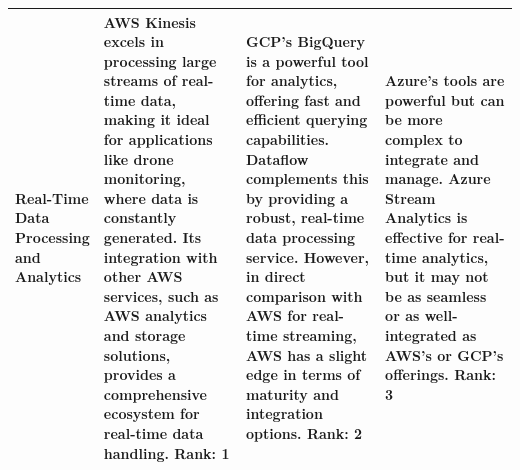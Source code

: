 \documentclass{article}
\begin{document}
\begin{table}[H]
\begin{tabular}{|p{0.1\linewidth}| p{0.3\linewidth} | p{0.3\linewidth} | p{0.3\linewidth} |}
        \hline 
        
        \textbf{Real-Time Data Processing and Analytics}&  \color{blue} AWS Kinesis excels in processing large streams of real-time data, making it ideal for applications like drone monitoring, where data is constantly generated. Its integration with other AWS services, such as AWS analytics and storage solutions, provides a comprehensive ecosystem for real-time data handling. \textbf{Rank: 1}
        
        &  GCP's BigQuery is a powerful tool for analytics, offering fast and efficient querying capabilities. Dataflow complements this by providing a robust, real-time data processing service. However, in direct comparison with AWS for real-time streaming, AWS has a slight edge in terms of maturity and integration options.
        \textbf{Rank: 2}
        & Azure's tools are powerful but can be more complex to integrate and manage. Azure Stream Analytics is effective for real-time analytics, but it may not be as seamless or as well-integrated as AWS's or GCP's offerings.
        \textbf{Rank: 3}\\
        \hline
\end{tabular}    
    
\end{table}
\end{document}
